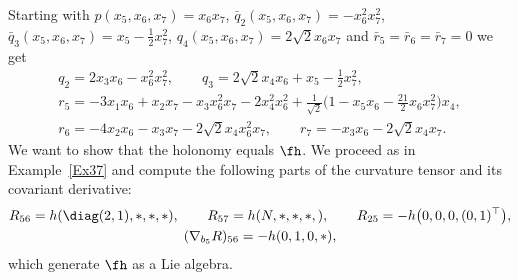 \begin{Example}
Starting with $p(x_5,x_6,x_7)=x_6x_7$, $\bar q_2(x_5,x_6,x_7)=-x_6^2x_7^2$, $\bar q_3(x_5,x_6,x_7)= x_5-\frac 12x_7^2$, $q_4(x_5,x_6,x_7)=2\sqrt2 x_6 x_7$ and $\bar r_5 =\bar r_6=\bar r_7=0$ we get
\begin{gather*}
q_2= 2x_3 x_6-x_6^2x_7^2, \qquad
q_3= 2\sqrt2 x_4 x_6 +x_5- \tfrac12 x_7^2, \\
r_5= -3x_1 x_6+x_2 x_7 -x_3 x_6^2x_7 -2 x_4^2x_6^2 +\tfrac1{\sqrt2}\big(1-x_5x_6-\tfrac{21}2 x_6 x_7^2\big) x_4, \\
r_6= -4x_2 x_6-x_3x_7-2\sqrt2 x_4 x_6^2 x_7, \qquad
r_7= -x_3x_6-2\sqrt2 x_4 x_7 .
\end{gather*}
We want to show that the holonomy equals $\fh$. We proceed as in Example~\ref{Ex37} and compute the following parts of the curvature tensor and its covariant derivative:
\begin{gather*}
R_{56}=h(\diag(2,1), *,*,*),\qquad R_{57}=h(N,*,*,*,),\qquad R_{25}=-h\big(0,0,0,(0,1)^\top\big),\\
(\nabla_{b_5} R)_{56}=-h(0,1,0,*),
\end{gather*}
which generate $\fh$ as a Lie algebra.
\end{Example}


